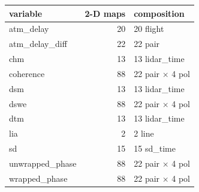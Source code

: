 \begin{tabular}{lrl}
\hline
variable & 2-D maps & composition \\
\hline
atm\_delay & 20 & 20 flight \\
atm\_delay\_diff & 22 & 22 pair \\
chm & 13 & 13 lidar\_time \\
coherence & 88 & 22 pair $\times$ 4 pol \\
dsm & 13 & 13 lidar\_time \\
dswe & 88 & 22 pair $\times$ 4 pol \\
dtm & 13 & 13 lidar\_time \\
lia & 2 & 2 line \\
sd & 15 & 15 sd\_time \\
unwrapped\_phase & 88 & 22 pair $\times$ 4 pol \\
wrapped\_phase & 88 & 22 pair $\times$ 4 pol \\
\hline
\end{tabular}
